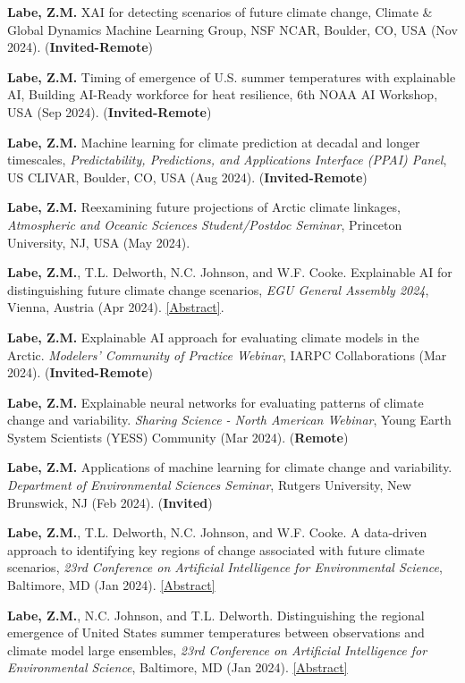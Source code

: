 \documentclass[margin,line,palatino,courier,10pt]{res}
\begin{document}
\begin{resume}
\begin{etaremune}[leftmargin=0in,topsep=0in,parsep=0in]
\item \textbf{Labe, Z.M.} XAI for detecting scenarios of future climate change, Climate \& Global Dynamics Machine Learning Group, NSF NCAR, Boulder, CO, USA (Nov 2024). (\textbf{Invited-Remote})
\item \textbf{Labe, Z.M.} Timing of emergence of U.S. summer temperatures with explainable AI, Building AI-Ready workforce for heat resilience, 6th NOAA AI Workshop, USA (Sep 2024). (\textbf{Invited-Remote})
\item \textbf{Labe, Z.M.} Machine learning for climate prediction at decadal and longer timescales, \textit{Predictability, Predictions, and Applications Interface (PPAI) Panel}, US CLIVAR, Boulder, CO, USA (Aug 2024). (\textbf{Invited-Remote}) 
\item \textbf{Labe, Z.M.} Reexamining future projections of Arctic climate linkages, \textit{Atmospheric and Oceanic Sciences Student/Postdoc Seminar}, Princeton University, NJ, USA (May 2024). 
\item \textbf{Labe, Z.M.}, T.L. Delworth, N.C. Johnson, and W.F. Cooke. Explainable AI for distinguishing future climate change scenarios, \textit{EGU General Assembly 2024}, Vienna, Austria (Apr 2024). \href{https://meetingorganizer.copernicus.org/EGU24/EGU24-9110.html}{[Abstract]}. 
\item \textbf{Labe, Z.M.} Explainable AI approach for evaluating climate models in the Arctic. \textit{Modelers' Community of Practice Webinar}, IARPC Collaborations (Mar 2024). (\textbf{Invited-Remote}) 
\item \textbf{Labe, Z.M.} Explainable neural networks for evaluating patterns of climate change and variability. \textit{Sharing Science - North American Webinar}, Young Earth System Scientists (YESS) Community (Mar 2024). (\textbf{Remote}) 
\item \textbf{Labe, Z.M.} Applications of machine learning for climate change and variability. \textit{Department of Environmental Sciences Seminar}, Rutgers University, New Brunswick, NJ (Feb 2024). (\textbf{Invited})
\item \textbf{Labe, Z.M.}, T.L. Delworth, N.C. Johnson, and W.F. Cooke. A data-driven approach to identifying key regions of change associated with future climate scenarios, \textit{23rd Conference on Artificial Intelligence for Environmental Science}, Baltimore, MD (Jan 2024). \href{https://ams.confex.com/ams/104ANNUAL/meetingapp.cgi/Paper/431300}{[Abstract]}
\item \textbf{Labe, Z.M.}, N.C. Johnson, and T.L. Delworth. Distinguishing the regional emergence of United States summer temperatures between observations and climate model large ensembles, \textit{23rd Conference on Artificial Intelligence for Environmental Science}, Baltimore, MD (Jan 2024). \href{https://ams.confex.com/ams/104ANNUAL/meetingapp.cgi/Paper/431288}{[Abstract]}

\end{etaremune}
\end{resume}
\end{document}
